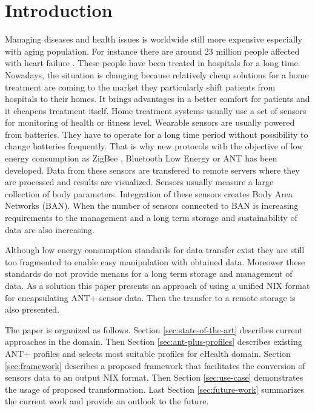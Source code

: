 \documentclass[conference]{IEEEconf}
\begin{document}
\section{Introduction}\label{sec:intro}
Managing diseases and health issues is worldwide still more expensive especially with aging population. For instance there are around 23 million people affected with heart failure \cite{bui2011epidemiology}. These people have been treated in hospitals for a long time. Nowadays, the situation is changing because relatively cheap solutions for a home treatment are coming to the market \cite{4761985, 5333913} they particularly shift patients from hospitals to their homes. It brings advantages in a better comfort for patients and it cheapens treatment itself. Home treatment systems usually use a set of sensors for monitoring of health or fitness level. Wearable sensors are usually powered from batteries. They have to operate for a long time period without possibility to change batteries frequently. That is why new protocols with the objective of low energy consumption as ZigBee \cite{Farahani:2008:ZWN:1457417}, Bluetooth Low Energy \cite{heydon2012bluetooth} or ANT \cite{zaloker2014ant} has been developed.  Data from these sensors are transfered to remote servers where they are processed and results are visualized. Sensors usually measure a large collection of body parameters. Integration of these sensors creates Body Area Networks (BAN). When the number of sensors connected to BAN is increasing requirements to the management and a long term storage and sustainability of data are also increasing.

Although low energy consumption standards for data transfer exist they are still too fragmented to enable easy manipulation with obtained data. Moreower these standards do not provide menans for a long term storage and management of data. As a solution this paper presents an approach of using a unified NIX format for encapsulating ANT+ sensor data. Then the transfer to a remote storage is also presented. 

The paper is organized as follows. Section \ref{sec:state-of-the-art} describes current approaches in the domain. Then Section \ref{sec:ant-plus-profiles} describes existing ANT+ profiles and selects most suitable profiles for eHealth domain. Section \ref{sec:framework} describes a proposed framework that facilitates the conversion of sensors data to an output NIX format. Then Section \ref{sec:use-case} demonstrates the usage of proposed transformation. Last Section \ref{sec:future-work} summarizes the current work and provide an outlook to the future.
\end{document}
